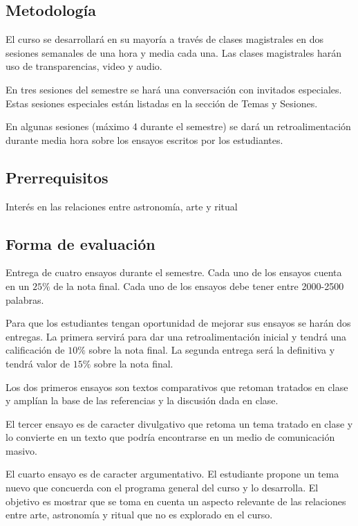 \documentclass{report}
\begin{document}
\subsection*{Metodolog\'ia}

El curso se desarrollar\'a en su mayor\'ia a trav\'es de clases
magistrales en dos sesiones semanales de una hora y media cada
una. Las clases magistrales har\'an uso de transparencias, video y
audio. 

En tres sesiones del semestre se har\'a una conversaci\'on con
invitados especiales. Estas sesiones especiales est\'an listadas en la
secci\'on de Temas y Sesiones.  

En algunas sesiones (m\'aximo 4 durante el semestre) se dar\'a un
retroalimentaci\'on durante media hora sobre los ensayos escritos por los
estudiantes. 

\subsection*{Prerrequisitos}
Inter\'es en las relaciones entre astronom\'ia, arte y ritual

\subsection*{Forma de evaluaci\'on}

Entrega de cuatro ensayos durante el semestre. Cada uno de los ensayos
cuenta en un $25 \%$ de la nota final. Cada uno de los ensayos debe
tener entre 2000-2500 palabras.  

Para que los estudiantes tengan oportunidad de mejorar sus ensayos se
har\'an dos entregas. La primera servir\'a para dar una
retroalimentaci\'on inicial y tendr\'a una calificaci\'on de $10\%$
sobre la nota final. La segunda entrega ser\'a la definitiva y
tendr\'a  valor de $15\%$ sobre la nota final. 
 
Los dos primeros ensayos son textos comparativos que retoman  tratados
en clase y ampl\'ian la base de las referencias y la discusi\'on dada
en clase. 

El tercer ensayo es de caracter divulgativo que retoma un tema
tratado en clase y lo convierte en un texto que podr\'ia encontrarse
en un medio de comunicaci\'on masivo.  

El cuarto ensayo es de caracter argumentativo. El estudiante propone
un tema nuevo que concuerda con el programa general del curso y lo
desarrolla. El objetivo es mostrar que se toma en cuenta un aspecto
relevante de las relaciones entre arte, astronom\'ia y ritual que
no es explorado en el curso.
\end{document}
